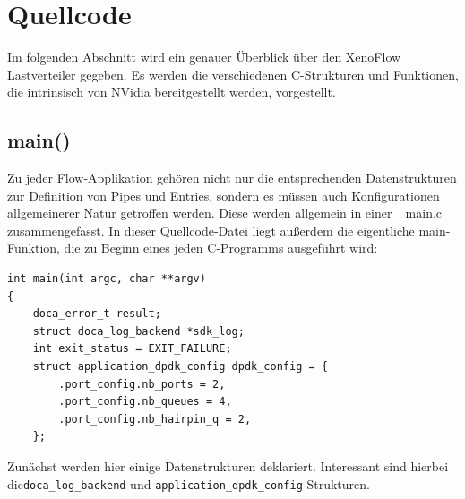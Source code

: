 \section{Quellcode}
Im folgenden Abschnitt wird ein genauer Überblick über den XenoFlow Lastverteiler gegeben. Es werden die verschiedenen C-Strukturen und Funktionen, die intrinsisch von NVidia bereitgestellt werden, vorgestellt. 
\subsection{main()}
Zu jeder Flow-Applikation gehören nicht nur die entsprechenden Datenstrukturen zur Definition von Pipes und Entries, sondern es müssen auch Konfigurationen allgemeinerer Natur getroffen werden. Diese werden allgemein in einer \_main.c zusammengefasst. In dieser Quellcode-Datei liegt außerdem die eigentliche main-Funktion, die zu Beginn eines jeden C-Programms ausgeführt wird:
\begin{verbatim}
int main(int argc, char **argv)
{
	doca_error_t result;
	struct doca_log_backend *sdk_log;
	int exit_status = EXIT_FAILURE;
	struct application_dpdk_config dpdk_config = {
		.port_config.nb_ports = 2,
		.port_config.nb_queues = 4,
		.port_config.nb_hairpin_q = 2,
	};
\end{verbatim}
Zunächst werden hier einige Datenstrukturen deklariert. Interessant sind hierbei die\newline\texttt{doca\_log\_backend} und \texttt{application\_dpdk\_config} Strukturen.

